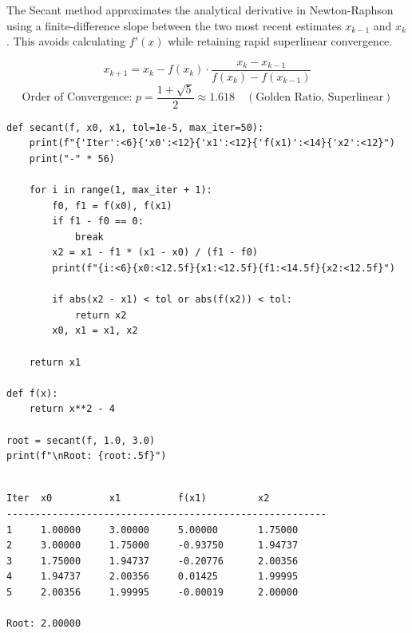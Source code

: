 \documentclass[10pt,a4paper]{report}
\begin{document}
The Secant method approximates the analytical derivative in Newton-Raphson using a finite-difference slope between the two most recent estimates $x_{k-1}$ and $x_k$. This avoids calculating $f'(x)$ while retaining rapid superlinear convergence.

\begin{tcolorbox}[colback=theorybg,colframe=theoryframe,title=\textbf{Mathematical Theory \& Formulation},boxrule=1pt,arc=2mm]
\[
x_{k+1} = x_k - f(x_k) \cdot \frac{x_k - x_{k-1}}{f(x_k) - f(x_{k-1})}
\]
\[
\text{Order of Convergence: } p = \frac{1 + \sqrt{5}}{2} \approx 1.618 \quad (\text{Golden Ratio, Superlinear})
\]
\end{tcolorbox}

\begin{tcolorbox}[colback=codebg,colframe=secondary,title=\textbf{Python Implementation (Step-by-Step Functions)},boxrule=1pt,arc=2mm]
\begin{lstlisting}[style=python_detailed]
def secant(f, x0, x1, tol=1e-5, max_iter=50):
    print(f"{'Iter':<6}{'x0':<12}{'x1':<12}{'f(x1)':<14}{'x2':<12}")
    print("-" * 56)

    for i in range(1, max_iter + 1):
        f0, f1 = f(x0), f(x1)
        if f1 - f0 == 0:
            break
        x2 = x1 - f1 * (x1 - x0) / (f1 - f0)
        print(f"{i:<6}{x0:<12.5f}{x1:<12.5f}{f1:<14.5f}{x2:<12.5f}")

        if abs(x2 - x1) < tol or abs(f(x2)) < tol:
            return x2
        x0, x1 = x1, x2

    return x1

def f(x):
    return x**2 - 4

root = secant(f, 1.0, 3.0)
print(f"\nRoot: {root:.5f}")


\end{lstlisting}
\end{tcolorbox}

\begin{tcolorbox}[colback=termbg,colframe=primary,title=\textbf{Program Execution Output \& Convergence Table},boxrule=1pt,arc=2mm]
\begin{lstlisting}[style=terminal_output]
Iter  x0          x1          f(x1)         x2          
--------------------------------------------------------
1     1.00000     3.00000     5.00000       1.75000     
2     3.00000     1.75000     -0.93750      1.94737     
3     1.75000     1.94737     -0.20776      2.00356     
4     1.94737     2.00356     0.01425       1.99995     
5     2.00356     1.99995     -0.00019      2.00000     

Root: 2.00000
\end{lstlisting}
\end{tcolorbox}
\end{document}
